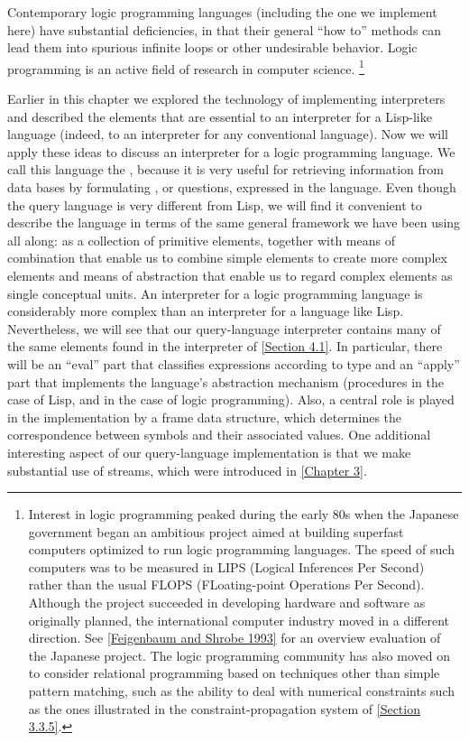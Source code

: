 Contemporary logic programming languages (including the one we implement here) have substantial deficiencies, in that their general “how to” methods can lead them into spurious infinite loops or other undesirable behavior.
Logic programming is an active field of research in computer science.%
\footnote{
	Interest in logic programming peaked during the early 80s when the Japanese government began an ambitious project aimed at building superfast computers optimized to run logic programming languages.
	The speed of such computers was to be measured in LIPS (Logical Inferences Per Second) rather than the usual FLOPS (FLoating-point Operations Per Second).
	Although the project succeeded in developing hardware and software as originally planned, the international computer industry moved in a different direction.
	See \cref{Feigenbaum and Shrobe 1993} for an overview evaluation of the Japanese project.
	The logic programming community has also moved on to consider relational programming based on techniques other than simple pattern matching, such as the ability to deal with numerical constraints such as the ones illustrated in the constraint-propagation system of \cref{Section 3.3.5}.
}

Earlier in this chapter we explored the technology of implementing interpreters and described the elements that are essential to an interpreter for a Lisp-like language (indeed, to an interpreter for any conventional language).
Now we will apply these ideas to discuss an interpreter for a logic programming language.
We call this language the , because it is very useful for retrieving information from data bases by formulating , or questions, expressed in the language.
Even though the query language is very different from Lisp, we will find it convenient to describe the language in terms of the same general framework we have been using all along:
as a collection of primitive elements, together with means of combination that enable us to combine simple elements to create more complex elements and means of abstraction that enable us to regard complex elements as single conceptual units.
An interpreter for a logic programming language is considerably more complex than an interpreter for a language like Lisp.
Nevertheless, we will see that our query-language interpreter contains many of the same elements found in the interpreter of \cref{Section 4.1}.
In particular, there will be an “eval” part that classifies expressions according to type and an “apply” part that implements the language’s abstraction mechanism (procedures in the case of Lisp, and  in the case of logic programming).
Also, a central role is played in the implementation by a frame data structure, which determines the correspondence between symbols and their associated values.
One additional interesting aspect of our query-language implementation is that we make substantial use of streams, which were introduced in \cref{Chapter 3}.





